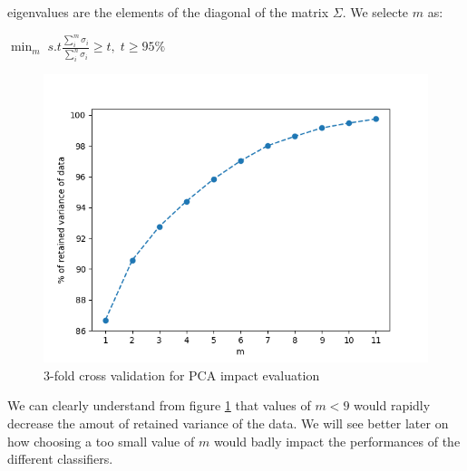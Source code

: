 \documentclass[10pt, a4paper, twocolumn]{article} %
\begin{document}
eigenvalues are the elements of the diagonal of the matrix $\Sigma$. We selecte $m$ as:
\begin{center}
	\begin{math}
		\min_m\;s.t \frac{\sum_{i}^{m}\sigma_{i}}{\sum_{i}^{n}\sigma_{i}} \ge t,\;t \ge 95\%
	\end{math}
\end{center}
\begin{figure}[ht!]
	\includegraphics[width=\linewidth]{./Pictures/FeaturesAnalysis/pca.png}
	\caption{3-fold cross validation for PCA impact evaluation}
	\label{pca} 
\end{figure}
We can clearly understand from figure \ref{pca} that values of $m < 9$ would rapidly
decrease the amout of retained variance of the data. We will see better later on how 
choosing a too small value of $m$ would badly impact the performances of the different classifiers.

\end{document}

